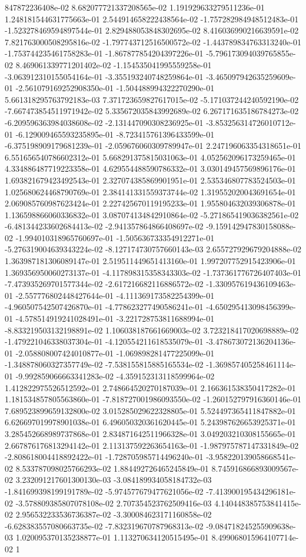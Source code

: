 847872236408e-02	8.682077721337208565e-02	1.191929633279511236e-01	1.248181544631775663e-01	2.544914658222438564e-02	-1.757282984948512483e-01	-1.523278469594897544e-01	2.829488053848302695e-02	8.416036990216639591e-02	7.821763000508295816e-02	-1.797743712516500572e-02	-1.443789834763313240e-01	-1.753744235461758283e-01	-1.867877854204397226e-01	-5.796173094039765855e-02	8.469061339771201402e-02	-1.154535041995559258e-01	-3.063912310155054164e-01	-3.355193240748259864e-01	-3.465097942635259609e-01	-2.561079169252908350e-01	-1.504488994322270290e-01	5.661318295763792183e-03	7.371723659827617015e-02	-5.171037244240592190e-02	-7.667473854511971942e-02	5.335672035843992689e-02	6.267171635186784273e-02	-6.209596363984038608e-02	-2.131447090308236925e-01	-3.853256314726010712e-01	-6.129009465593235895e-01	-8.723415761396433599e-01	-6.375198909179681239e-01	-2.059676060309789947e-01	2.247196063354318651e-01	6.551656540786602312e-01	5.668291375815031063e-01	4.052562096173259465e-01	4.334886487719223358e-01	4.629554488590786332e-01	3.030149457569896176e-01	1.693821679423492543e-01	2.327074385869901951e-01	2.535346807783524503e-01	1.025680624468790769e-01	2.384141331559373744e-02	1.319552020043691654e-01	2.069085760987623424e-01	2.227425670119195233e-01	1.955804632039306878e-01	1.136598866060336832e-01	3.087074134842910864e-02	-5.271865419036382561e-02	-6.481344233602684413e-02	-2.941357864866408697e-02	-9.159142947830158088e-02	-1.994010318965760697e-01	-1.505636733354912271e-01	-5.276319004639343224e-02	-8.127174730757660143e-03	2.655727929679204888e-02	1.363987181306089147e-01	2.519511449651413160e-01	1.997207752915423906e-01	1.369356950060273137e-01	-4.117898315358343303e-02	-1.737361776726407403e-01	-7.473935269701577344e-02	-2.617216682116886572e-02	-1.330957619436109463e-01	-2.557776802448427644e-01	-4.111369173582254399e-01	-4.960507542507426870e-01	-4.778623277490586241e-01	-4.650295413098456399e-01	-4.578514919241028491e-01	-3.221728753811688994e-01	-8.833219503132198891e-02	1.106038187661669003e-02	3.723218417020698889e-02	-1.479221046338037304e-01	-4.120554211618535079e-01	-3.478673072136204136e-01	-2.058808007424010877e-01	-1.069898281477225099e-01	-1.348878060327357749e-02	-7.538155815885165534e-02	-1.369857405258461114e-01	-9.992859066663341283e-02	-4.359152313118599964e-02	1.412822975526512592e-01	2.748664520270187039e-01	2.166361538350417282e-01	1.181534857805563860e-01	-7.818727001986093550e-02	-1.260152797916360146e-01	7.689523899659132800e-02	3.015285029622328805e-01	5.524497365411847882e-01	6.626697019978901038e-01	6.496050320361620445e-01	5.243987626653925371e-01	3.285452668989737868e-01	2.834871642511966328e-01	3.049203210308155665e-01	2.667876176813294142e-01	2.113137592263654163e-01	-1.987975787147331849e-02	-2.808618004418892422e-01	-1.728705985714496240e-01	-3.958220139058668541e-02	8.533787098025766293e-02	1.884492726465245849e-01	8.745916866893009567e-02	3.232091217601300130e-03	-3.084189934058184732e-03	-1.841699398199191789e-02	-5.974577679477621056e-02	-7.413900195434296181e-02	-3.578809385807078108e-02	2.707354523762509416e-03	4.140448385753841415e-02	2.956532233536736387e-02	-3.300084623171160858e-02	-6.628383557080663735e-02	-7.832319670787968313e-02	-9.084718245255909638e-03	1.020095370135238877e-01	1.113270634120515495e-01	8.499068015964107714e-02	1